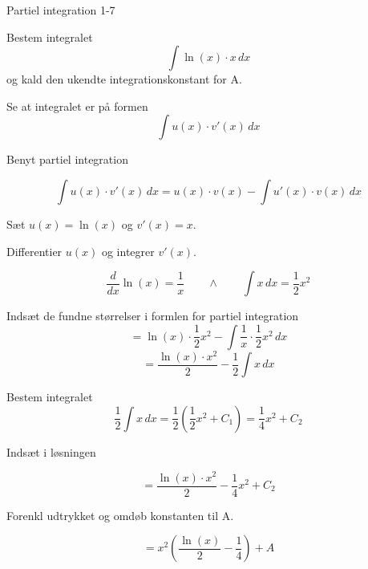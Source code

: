 \documentclass{article}
\begin{document}
\begin{exercise}{Partiel integration 1-7}
	
	
	Bestem integralet
	\[
	\int \ln(x) \cdot x \, dx
	\]
	og kald den ukendte integrationskonstant for A.
	
	
	
	\hint
	
	Se at integralet er på formen
	\[
	\int u(x) \cdot v'(x) \, dx
	\]
	
	\hint
	
	Benyt partiel integration
	
	\hint
	\[
	\int u(x) \cdot v'(x)\, dx = u(x) \cdot v(x) - \int u'(x) \cdot v(x) \, dx
	\]
	\hint
	
	Sæt $u(x) = \ln(x)$ og $v'(x) = x$.
	
	
	\hint
	
	Differentier $u(x)$ og integrer $v'(x)$.
	
	\hint
	\[
	\frac{d}{dx}\ln(x) = \frac{1}{x} \qquad \wedge \qquad \int x \, dx = \frac{1 }{2}x^2
	\]
	
	\hint
	
	Indsæt de fundne størrelser i formlen for partiel integration
	\[
	= \ln(x) \cdot \frac{1}{2}x^2 - \int \frac{1}{x} \cdot \frac{1}{2}x^2 \, dx 
	\]
	\[
	= \frac{\ln(x) \cdot x^2}{2} - \frac{1}{2}\int x \, dx 
	\]
	
	\hint
	
	Bestem integralet
	\[
	\frac{1}{2}\int x \, dx = \frac{1}{2} \left( \frac{1}{2}x^2 + C_1 \right) = \frac{1}{4}x^2 + C_2
	\]
	
	\hint
	Indsæt i løsningen 
	
	\hint
	
	\[
	= \frac{\ln(x) \cdot x^2}{2} - \frac{1}{4}x^2 + C_2
	\]
	
	\hint
	
	Forenkl udtrykket og omdøb konstanten til A.
	
	\hint
	
	\[
	= x^2 \left( \frac{\ln(x)}{2} - \frac{1}{4}   \right) + A
	\]
	
	
\end{exercise}

\newpage
\end{document}
